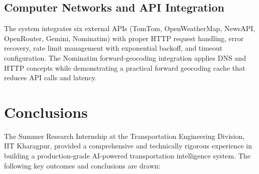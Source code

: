 \documentclass[12pt, a4paper]{report}
\begin{document}
\subsection*{Computer Networks and API Integration}

The system integrates six external APIs (TomTom, OpenWeatherMap, NewsAPI, OpenRouter, Gemini, Nominatim) with proper HTTP request handling, error recovery, rate limit management with exponential backoff, and timeout configuration. The Nominatim forward-geocoding integration applies DNS and HTTP concepts while demonstrating a practical forward geocoding cache that reduces API calls and latency.

\clearpage

\section*{Conclusions}

The Summer Research Internship at the Transportation Engineering Division, IIT Kharagpur, provided a comprehensive and technically rigorous experience in building a production-grade AI-powered transportation intelligence system. The following key outcomes and conclusions are drawn:
\end{document}

